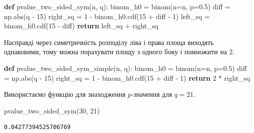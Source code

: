 \documentclass[
  letterpaper,
  10pt,
  openany]{report}
\newenvironment{Shaded}{\begin{snugshade}}{\end{snugshade}}
\newcommand{\BuiltInTok}[1]{\textcolor[rgb]{0.00,0.23,0.31}{#1}}
\newcommand{\ControlFlowTok}[1]{\textcolor[rgb]{0.00,0.23,0.31}{\textbf{#1}}}
\newcommand{\DecValTok}[1]{\textcolor[rgb]{0.68,0.00,0.00}{#1}}
\newcommand{\FloatTok}[1]{\textcolor[rgb]{0.68,0.00,0.00}{#1}}
\newcommand{\KeywordTok}[1]{\textcolor[rgb]{0.00,0.23,0.31}{\textbf{#1}}}
\newcommand{\NormalTok}[1]{\textcolor[rgb]{0.00,0.23,0.31}{#1}}
\newcommand{\OperatorTok}[1]{\textcolor[rgb]{0.37,0.37,0.37}{#1}}
\theoremstyle{definition}
\theoremstyle{remark}
\begin{document}
\begin{Shaded}
\begin{Highlighting}[]
\KeywordTok{def}\NormalTok{ pvalue\_two\_sided\_sym(n, q):}
\NormalTok{    binom\_h0 }\OperatorTok{=}\NormalTok{ binom(n}\OperatorTok{=}\NormalTok{n, p}\OperatorTok{=}\FloatTok{0.5}\NormalTok{)}
\NormalTok{    diff }\OperatorTok{=}\NormalTok{ np.}\BuiltInTok{abs}\NormalTok{(q }\OperatorTok{{-}} \DecValTok{15}\NormalTok{)}
\NormalTok{    right\_sq }\OperatorTok{=} \DecValTok{1} \OperatorTok{{-}}\NormalTok{ binom\_h0.cdf(}\DecValTok{15} \OperatorTok{+}\NormalTok{ diff }\OperatorTok{{-}} \DecValTok{1}\NormalTok{)}
\NormalTok{    left\_sq }\OperatorTok{=}\NormalTok{ binom\_h0.cdf(}\DecValTok{15} \OperatorTok{{-}}\NormalTok{ diff)}
    \ControlFlowTok{return}\NormalTok{ left\_sq }\OperatorTok{+}\NormalTok{ right\_sq}
\end{Highlighting}
\end{Shaded}

Насправді через симетричність розподілу ліва і права площа виходять
однаковими, тому можна порахувати площу з одного боку і помножити на 2.

\begin{Shaded}
\begin{Highlighting}[]
\KeywordTok{def}\NormalTok{ pvalue\_two\_sided\_sym\_simple(n, q):}
\NormalTok{    binom\_h0 }\OperatorTok{=}\NormalTok{ binom(n}\OperatorTok{=}\NormalTok{n, p}\OperatorTok{=}\FloatTok{0.5}\NormalTok{)}
\NormalTok{    diff }\OperatorTok{=}\NormalTok{ np.}\BuiltInTok{abs}\NormalTok{(q }\OperatorTok{{-}} \DecValTok{15}\NormalTok{)}
\NormalTok{    right\_sq }\OperatorTok{=} \DecValTok{1} \OperatorTok{{-}}\NormalTok{ binom\_h0.cdf(}\DecValTok{15} \OperatorTok{+}\NormalTok{ diff }\OperatorTok{{-}} \DecValTok{1}\NormalTok{)}
    \ControlFlowTok{return} \DecValTok{2} \OperatorTok{*}\NormalTok{ right\_sq}
\end{Highlighting}
\end{Shaded}

Використаємо функцію для знаходження \(p\)-значення для \(q = 21\).

\begin{Shaded}
\begin{Highlighting}[]
\NormalTok{pvalue\_two\_sided\_sym(}\DecValTok{30}\NormalTok{, }\DecValTok{21}\NormalTok{)}
\end{Highlighting}
\end{Shaded}

\begin{verbatim}
0.04277394525706769
\end{verbatim}
\end{document}
